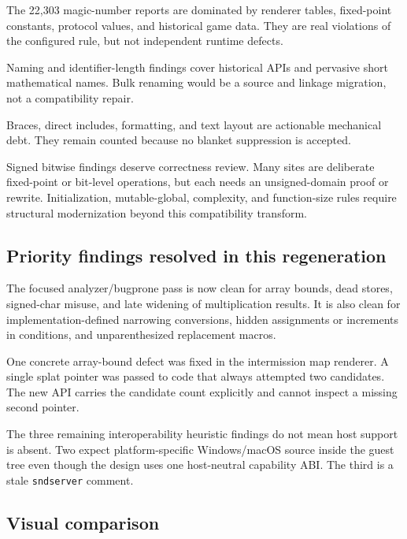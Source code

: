 \documentclass[11pt]{article}
\begin{document}
The 22,303 magic-number reports are dominated by renderer tables, fixed-point
constants, protocol values, and historical game data. They are real violations
of the configured rule, but not independent runtime defects.

Naming and identifier-length findings cover historical APIs and pervasive
short mathematical names. Bulk renaming would be a source and linkage migration,
not a compatibility repair.

Braces, direct includes, formatting, and text layout are actionable mechanical
debt. They remain counted because no blanket suppression is accepted.

Signed bitwise findings deserve correctness review. Many sites are deliberate
fixed-point or bit-level operations, but each needs an unsigned-domain proof or
rewrite. Initialization, mutable-global, complexity, and function-size rules
require structural modernization beyond this compatibility transform.

\subsection*{Priority findings resolved in this regeneration}
The focused analyzer/bugprone pass is now clean for array bounds, dead stores,
signed-char misuse, and late widening of multiplication results. It is also
clean for implementation-defined narrowing conversions, hidden assignments or
increments in conditions, and unparenthesized replacement macros.

One concrete array-bound defect was fixed in the intermission map renderer. A
single splat pointer was passed to code that always attempted two candidates.
The new API carries the candidate count explicitly and cannot inspect a missing
second pointer.

The three remaining interoperability heuristic findings do not mean host
support is absent. Two expect platform-specific Windows/macOS source inside the
guest tree even though the design uses one host-neutral capability ABI. The
third is a stale \texttt{sndserver} comment.

\subsection*{Visual comparison}
\begin{center}
\end{center}
\end{document}
